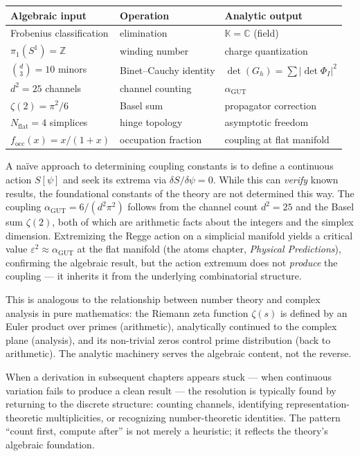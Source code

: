 \begin{center}
\begin{tabular}{lll}
\toprule
\textbf{Algebraic input} & \textbf{Operation} & \textbf{Analytic output} \\
\midrule
Frobenius classification & elimination & $\mathbb{K} = \mathbb{C}$ (field) \\
$\pi_1(S^1) = \mathbb{Z}$ & winding number & charge quantization \\
$\binom{d}{3} = 10$ minors & Binet--Cauchy identity & $\det(G_h) = \sum|\det \Phi_I|^2$ \\
$d^2 = 25$ channels & channel counting & $\alpha_{\mathrm{GUT}}$ \\
$\zeta(2) = \pi^2/6$ & Basel sum & propagator correction \\
$N_{\mathrm{flat}} = 4$ simplices & hinge topology & asymptotic freedom \\
$f_{\mathrm{occ}}(x) = x/(1+x)$ & occupation fraction & coupling at flat manifold \\
\bottomrule
\end{tabular}
\end{center}

\begin{remark}
A na\"ive approach to determining coupling constants is to define a continuous action $S[\psi]$ and seek its extrema via $\delta S/\delta\psi = 0$. While this can \emph{verify} known results, the foundational constants of the theory are not determined this way. The coupling $\alpha_{\mathrm{GUT}} = 6/(d^2\pi^2)$ follows from the channel count $d^2 = 25$ and the Basel sum $\zeta(2)$, both of which are arithmetic facts about the integers and the simplex dimension. Extremizing the Regge action on a simplicial manifold yields a critical value $\varepsilon^2 \approx \alpha_{\mathrm{GUT}}$ at the flat manifold (the atoms chapter, \textit{Physical Predictions}), confirming the algebraic result, but the action extremum does not \emph{produce} the coupling --- it inherits it from the underlying combinatorial structure.

This is analogous to the relationship between number theory and complex analysis in pure mathematics: the Riemann zeta function $\zeta(s)$ is defined by an Euler product over primes (arithmetic), analytically continued to the complex plane (analysis), and its non-trivial zeros control prime distribution (back to arithmetic). The analytic machinery serves the algebraic content, not the reverse.
\end{remark}

\begin{remark}
When a derivation in subsequent chapters appears stuck --- when continuous variation fails to produce a clean result --- the resolution is typically found by returning to the discrete structure: counting channels, identifying representation-theoretic multiplicities, or recognizing number-theoretic identities. The pattern ``count first, compute after'' is not merely a heuristic; it reflects the theory's algebraic foundation.
\end{remark}

